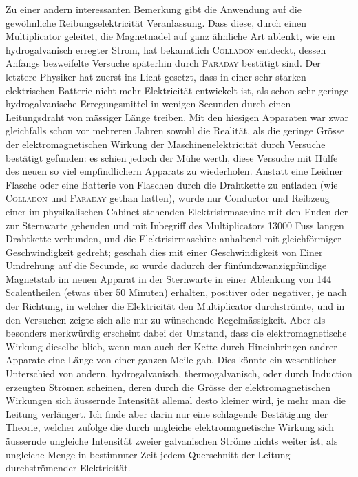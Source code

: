 \par\clearpage
{}
Zu einer andern interessanten Bemerkung gibt die Anwendung auf die gewöhnliche Reibungselektricität Veranlassung. Dass diese, durch einen Multiplicator geleitet, die Magnetnadel auf ganz ähnliche Art ablenkt, wie ein hydrogalvanisch erregter Strom, hat bekanntlich \textsc{Colladon} entdeckt, dessen Anfangs bezweifelte Versuche späterhin durch \textsc{Faraday} bestätigt sind. Der letztere Physiker hat zuerst ins Licht gesetzt, dass in einer sehr starken elektrischen Batterie nicht mehr Elektricität entwickelt ist, als schon sehr geringe hydrogalvanische Erregungsmittel in wenigen Secunden durch einen Leitungsdraht von mässiger Länge treiben. Mit den hiesigen Apparaten war zwar gleichfalls schon vor mehreren Jahren sowohl die Realität, als die geringe Grösse der elektromagnetischen Wirkung der Maschinenelektricität durch Versuche bestätigt gefunden: es schien jedoch der Mühe werth, diese Versuche mit Hülfe des neuen so viel empfindlichern Apparats zu wiederholen. Anstatt eine Leidner Flasche oder eine Batterie von Flaschen durch die Drahtkette zu entladen (wie \textsc{Colladon} und \textsc{Faraday} gethan hatten), wurde nur Conductor und Reibzeug einer im physikalischen Cabinet stehenden Elektrisirmaschine mit den Enden der zur Sternwarte gehenden und mit Inbegriff des Multiplicators 13000 Fuss langen Drahtkette verbunden, und die Elektrisirmaschine anhaltend mit gleichförmiger Geschwindigkeit gedreht; geschah dies mit einer Geschwindigkeit von Einer Umdrehung auf die Secunde, so wurde dadurch der fünfundzwanzigpfündige Magnetstab im neuen Apparat in der Sternwarte in einer Ablenkung von 144 Scalentheilen (etwas über 50 Minuten) erhalten, positiver oder negativer, je nach der Richtung, in welcher die Elektricität den Multiplicator durchströmte, und in den Versuchen zeigte sich alle nur zu wünschende Regelmässigkeit. Aber als besonders merkwürdig erscheint dabei der Umstand, dass die elektromagnetische Wirkung dieselbe blieb, wenn man auch der Kette durch Hineinbringen andrer Apparate eine Länge von einer ganzen Meile gab. Dies könnte ein wesentlicher Unterschied von andern, hydrogalvanisch, thermogalvanisch, oder durch Induction erzeugten Strömen scheinen, deren durch die Grösse der elektromagnetischen Wirkungen sich äussernde Intensität allemal desto kleiner wird, je mehr man die Leitung verlängert. Ich finde aber darin nur eine schlagende Bestätigung der Theorie, welcher zufolge die durch ungleiche elektromagnetische Wirkung sich äussernde ungleiche Intensität zweier galvanischen Ströme nichts weiter ist, als ungleiche Menge in bestimmter Zeit jedem Querschnitt der Leitung durchströmender Elektricität.
